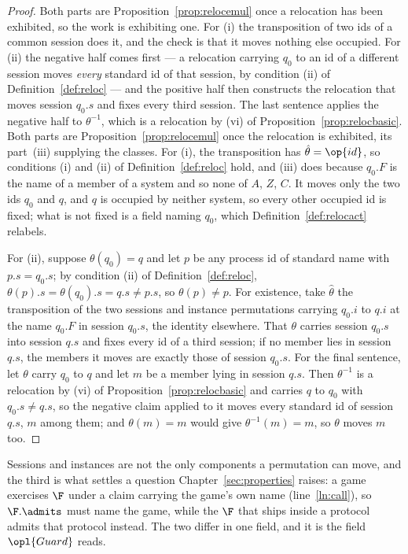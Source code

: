 \documentclass[10pt,oneside,openany]{book}
\theoremstyle{accentdef}
\theoremstyle{accentplain}
\begin{document}
\begin{proof}
Both parts are Proposition~\ref{prop:relocemul} once a relocation has been exhibited, so the work is
exhibiting one. For (i) the transposition of two ids of a common session does it, and the check is
that it moves nothing else occupied. For (ii) the negative half comes first --- a relocation carrying
$q_0$ to an id of a different session moves \emph{every} standard id of that session, by condition
(ii) of Definition~\ref{def:reloc} --- and the positive half then constructs the relocation that
moves session $q_0.s$ and fixes every third session. The last sentence applies the negative half to
$\theta^{-1}$, which is a relocation by (vi) of Proposition~\ref{prop:relocbasic}.
Both parts are Proposition~\ref{prop:relocemul} once the relocation is exhibited, its part~(iii)
supplying the classes. For (i), the transposition has $\hat\theta = \op{id}$, so conditions (i) and (ii)
of Definition~\ref{def:reloc} hold, and (iii) does because $q_0.F$ is the name of a member of a
system and so none of $A$, $Z$, $C$. It moves only the two ids $q_0$ and $q$, and $q$ is occupied by
neither system, so every other occupied id is fixed; what is not fixed is a field naming $q_0$, which
Definition~\ref{def:relocact} relabels.

For (ii), suppose $\theta(q_0) = q$ and let $p$ be any
process id of standard name with $p.s = q_0.s$; by condition (ii) of Definition~\ref{def:reloc},
$\theta(p).s = \theta(q_0).s = q.s \neq p.s$, so $\theta(p) \neq p$. For existence, take $\hat\theta$ the
transposition of the two sessions and instance permutations
carrying $q_0.i$ to $q.i$ at the name $q_0.F$ in session $q_0.s$, the identity elsewhere. That
$\theta$ carries session $q_0.s$ into session $q.s$ and fixes every id of a third session; if no
member lies in session $q.s$, the members it moves are exactly those of session $q_0.s$. For the
final sentence, let $\theta$ carry $q_0$ to $q$ and let $m$ be a member lying in session $q.s$. Then
$\theta^{-1}$ is a relocation by (vi) of Proposition~\ref{prop:relocbasic} and carries $q$ to $q_0$
with $q_0.s \neq q.s$, so the negative claim applied to it moves every standard id of session $q.s$,
$m$ among them; and $\theta(m) = m$ would give $\theta^{-1}(m) = m$, so $\theta$ moves $m$ too.
\end{proof}

Sessions and instances are not the only components a permutation can move, and the third is what
settles a question Chapter~\ref{sec:properties} raises: a game exercises $\F$ under a claim carrying
the game's own name (line~\ref{ln:call}), so $\F.\admits$ must name the game, while the $\F$ that ships
inside a protocol admits that protocol instead. The two differ in one field, and it is the field
$\opl{Guard}$ reads.
\end{document}
